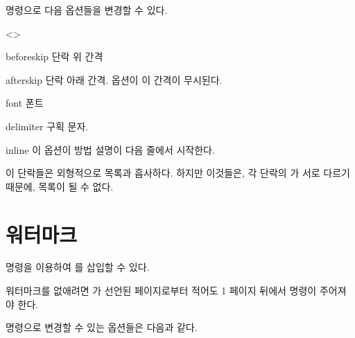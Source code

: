 \documentclass[minted]{hzguide}
\begin{document}
\begin{code}
\end{code}

\macro{\ActionSetup} 명령으로 다음 옵션들을 변경할 수 있다.

\begin{macros}<\ActionSetup>
\item[beforeskip] \keyvalue{0.5\hzparksip}
단락 위 간격

\item[afterskip] \keyvalue{-\hzparksip}
단락 아래 간격.  옵션이  이 간격이 무시된다.

\item[font] \keyvalue{\bfseries}
폰트 

\item[delimiter] \keyvalue{:, \quad}
구획 문자.

\item[inline] \keyvalueTF
이 옵션이  방법 설명이 다음 줄에서 시작한다.
\end{macros}

이 단락들은 외형적으로 목록과 흡사하다.
하지만 이것들은, 각 단락의 가 서로 다르기 때문에, 목록이 될 수 없다. 

\section{워터마크}

\macro{\watermark} 명령을 이용하여 를 삽입할 수 있다.

\begin{code}
\end{code}
\codeinput

워터마크를 없애려면 \macro{\watermark}가 선언된 페이지로부터 적어도 1 페이지 뒤에서 \macro{\ClearWatermark} 명령이 주어져야 한다.

\begin{code}
\ClearWatermark
\end{code}

\macro{\WatermarkSetup} 명령으로 변경할 수 있는 옵션들은 다음과 같다.
\end{document}
